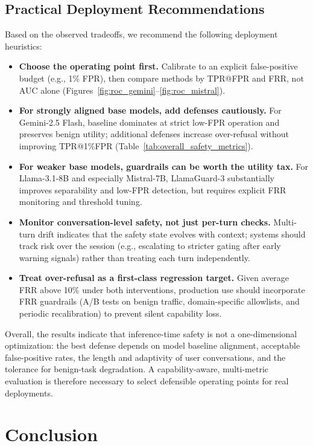 \documentclass[10pt, twocolumn]{article}
\begin{document}
\subsection{Practical Deployment Recommendations}

Based on the observed tradeoffs, we recommend the following deployment heuristics:
\begin{itemize}
    \item \textbf{Choose the operating point first.} Calibrate to an explicit false-positive budget (e.g., 1\% FPR), then compare methods by TPR@FPR and FRR, not AUC alone (Figures~\ref{fig:roc_gemini}--\ref{fig:roc_mistral}).
    \item \textbf{For strongly aligned base models, add defenses cautiously.} For Gemini-2.5 Flash, baseline dominates at strict low-FPR operation and preserves benign utility; additional defenses increase over-refusal without improving TPR@1\%FPR (Table~\ref{tab:overall_safety_metrics}).
    \item \textbf{For weaker base models, guardrails can be worth the utility tax.} For Llama-3.1-8B and especially Mistral-7B, LlamaGuard-3 substantially improves separability and low-FPR detection, but requires explicit FRR monitoring and threshold tuning.
    \item \textbf{Monitor conversation-level safety, not just per-turn checks.} Multi-turn drift indicates that the safety state evolves with context; systems should track risk over the session (e.g., escalating to stricter gating after early warning signals) rather than treating each turn independently.
    \item \textbf{Treat over-refusal as a first-class regression target.} Given average FRR above 10\% under both interventions, production use should incorporate FRR guardrails (A/B tests on benign traffic, domain-specific allowlists, and periodic recalibration) to prevent silent capability loss.
\end{itemize}

Overall, the results indicate that inference-time safety is not a one-dimensional optimization: the best defense depends on model baseline alignment, acceptable false-positive rates, the length and adaptivity of user conversations, and the tolerance for benign-task degradation. A capability-aware, multi-metric evaluation is therefore necessary to select defensible operating points for real deployments.

\section{Conclusion}
\label{sec:conclusion}
\end{document}
